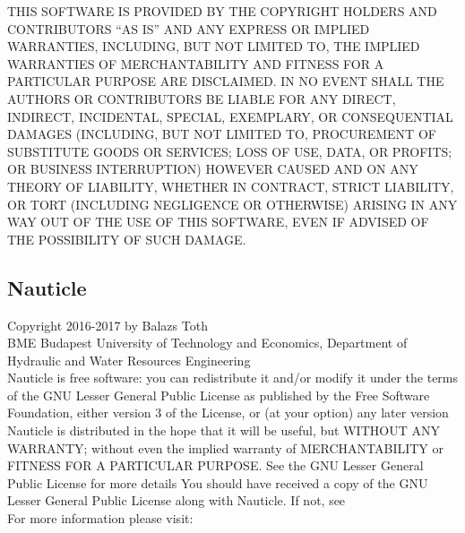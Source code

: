 \documentclass[a4paper,12pt,openany]{book}
\newcommand{\myhref}[3][nauticlegreen_dark]{\href{#2}{\color{#1}{#3}}}%
\theoremstyle{break}
\begin{document}
THIS SOFTWARE IS PROVIDED BY THE COPYRIGHT HOLDERS AND CONTRIBUTORS “AS IS” AND ANY EXPRESS OR IMPLIED WARRANTIES, INCLUDING, BUT NOT LIMITED TO, THE IMPLIED WARRANTIES OF MERCHANTABILITY AND FITNESS FOR A PARTICULAR PURPOSE ARE DISCLAIMED. IN NO EVENT SHALL THE AUTHORS OR CONTRIBUTORS BE LIABLE FOR ANY DIRECT, INDIRECT, INCIDENTAL, SPECIAL, EXEMPLARY, OR CONSEQUENTIAL DAMAGES (INCLUDING, BUT NOT LIMITED TO, PROCUREMENT OF SUBSTITUTE GOODS OR SERVICES; LOSS OF USE, DATA, OR PROFITS; OR BUSINESS INTERRUPTION) HOWEVER CAUSED AND ON ANY THEORY OF LIABILITY, WHETHER IN CONTRACT, STRICT LIABILITY, OR TORT (INCLUDING NEGLIGENCE OR OTHERWISE) ARISING IN ANY WAY OUT OF THE USE OF THIS SOFTWARE, EVEN IF ADVISED OF THE POSSIBILITY OF SUCH DAMAGE.

\subsection{Nauticle}
\noindent
Copyright \textcopyright{} 2016-2017 by Balazs Toth \\
\noindent
BME Budapest University of Technology and Economics, Department of Hydraulic and Water Resources Engineering\\

Nauticle is free software: you can redistribute it and/or modify it under the terms of the GNU Lesser General Public License as published by the Free Software Foundation, either version 3 of the License, or (at your option) any later version Nauticle is distributed in the hope that it will be useful, but WITHOUT ANY WARRANTY; without even the implied warranty of MERCHANTABILITY or FITNESS FOR A PARTICULAR PURPOSE.  See the GNU Lesser General Public License for more details You should have received a copy of the GNU Lesser General Public License along with Nauticle.  If not, see \myhref{http://www.gnu.org/licenses/}{http://www.gnu.org/licenses/}\\
 For more information please visit: \myhref{https://bitbucket.org/Nauticleproject/}{https://bitbucket.org/Nauticleproject/}
\end{document}
